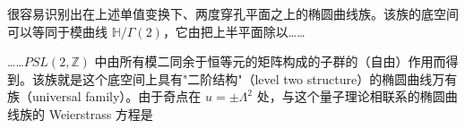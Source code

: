 很容易识别出在上述单值变换下、两度穿孔平面之上的椭圆曲线族。该族的底空间可以等同于模曲线 $\mathbb{H}/\Gamma(2)$，它由把上半平面除以……



……$PSL(2,\mathbb{Z})$ 中由所有模二同余于恒等元的矩阵构成的子群的（自由）作用而得到。该族就是这个底空间上具有"二阶结构"（level two structure）的椭圆曲线万有族（universal family）。由于奇点在 $u=\pm\Lambda^2$ 处，与这个量子理论相联系的椭圆曲线族的 Weierstrass 方程是

